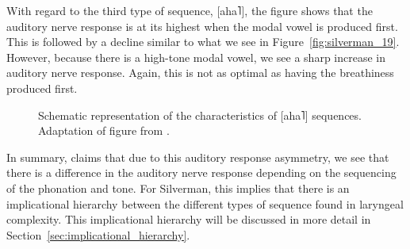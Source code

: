 With regard to the third type of sequence, [aha˥], the figure shows that the auditory nerve response is at its highest when the modal vowel is produced first. This is followed by a decline similar to what we see in Figure~\ref{fig:silverman_19}. However, because there is a high-tone modal vowel, we see a sharp increase in auditory nerve response. Again, this is not as optimal as having the breathiness produced first. 
\begin{figure}[h!]
    \centering
    \caption{Schematic representation of the characteristics of [aha˥] sequences. Adaptation of figure from \citet{silvermanLaryngealComplexityOtomanguean1997}.}
    \label{fig:silverman_20}
\end{figure}

In summary, \citeauthor{silvermanLaryngealComplexityOtomanguean1997} claims that due to this auditory response asymmetry, we see that there is a difference in the auditory nerve response depending on the sequencing of the phonation and tone. For Silverman, this implies that there is an implicational hierarchy between the different types of sequence found in laryngeal complexity. This implicational hierarchy will be discussed in more detail in Section~\ref{sec:implicational_hierarchy}.

